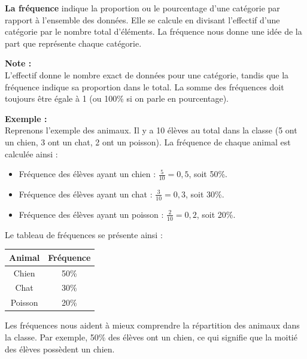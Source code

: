 \documentclass{article}
\begin{document}
\begin{tcolorbox}
\textbf{La fréquence} indique la proportion ou le pourcentage d'une catégorie par rapport à l'ensemble des données. Elle se calcule en divisant l'effectif d'une catégorie par le nombre total d'éléments. La fréquence nous donne une idée de la part que représente chaque catégorie.
\end{tcolorbox}

\vspace{0.15cm}

\begin{tcolorbox}
\textbf{Note :} \\
L'effectif donne le nombre exact de données pour une catégorie, tandis que la fréquence indique sa proportion dans le total. La somme des fréquences doit toujours être égale à 1 (ou 100\% si on parle en pourcentage).
\end{tcolorbox}

\begin{tcolorbox}
\textbf{Exemple :} \\  
Reprenons l'exemple des animaux. Il y a 10 élèves au total dans la classe (5 ont un chien, 3 ont un chat, 2 ont un poisson). La fréquence de chaque animal est calculée ainsi :

\begin{itemize}
    \item Fréquence des élèves ayant un chien : \( \frac{5}{10} = 0,5 \), soit 50\%.
    \item Fréquence des élèves ayant un chat : \( \frac{3}{10} = 0,3 \), soit 30\%.
    \item Fréquence des élèves ayant un poisson : \( \frac{2}{10} = 0,2 \), soit 20\%.
\end{itemize}

Le tableau de fréquences se présente ainsi :

\begin{center}
\begin{tabular}{|c|c|}
\hline
Animal & Fréquence \\
\hline
Chien & 50\% \\
Chat & 30\% \\
Poisson & 20\% \\
\hline
\end{tabular}
\end{center}

Les fréquences nous aident à mieux comprendre la répartition des animaux dans la classe. Par exemple, 50\% des élèves ont un chien, ce qui signifie que la moitié des élèves possèdent un chien.
\end{tcolorbox}
\end{document}
